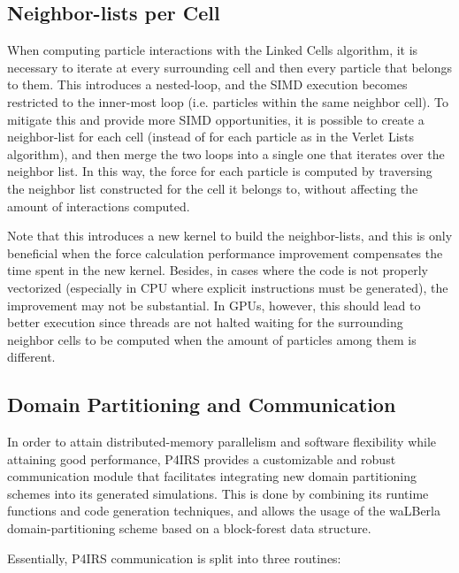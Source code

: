 \documentclass[Afour,sageh,times]{sagej}
\begin{document}
\subsection{Neighbor-lists per Cell}
\label{sec:neighbor_lists_per_cell}

When computing particle interactions with the Linked Cells algorithm, it is necessary to iterate at every surrounding cell and then every particle that belongs to them.
This introduces a nested-loop, and the SIMD execution becomes restricted to the inner-most loop (i.e. particles within the same neighbor cell).
To mitigate this and provide more SIMD opportunities, it is possible to create a neighbor-list for each cell (instead of for each particle as in the Verlet Lists algorithm), and then merge the two loops into a single one that iterates over the neighbor list.
In this way, the force for each particle is computed by traversing the neighbor list constructed for the cell it belongs to, without affecting the amount of interactions computed.

Note that this introduces a new kernel to build the neighbor-lists, and this is only beneficial when the force calculation performance improvement compensates the time spent in the new kernel.
Besides, in cases where the code is not properly vectorized (especially in CPU where explicit instructions must be generated), the improvement may not be substantial.
In GPUs, however, this should lead to better execution since threads are not halted waiting for the surrounding neighbor cells to be computed when the amount of particles among them is different.

\subsection{Domain Partitioning and Communication}
\label{sec:domain_partitioning}

In order to attain distributed-memory parallelism and software flexibility while attaining good performance, P4IRS provides a customizable and robust communication module that facilitates integrating new domain partitioning schemes into its generated simulations.
This is done by combining its runtime functions and code generation techniques, and allows the usage of the waLBerla domain-partitioning scheme based on a block-forest data structure.

Essentially, P4IRS communication is split into three routines:
\end{document}
